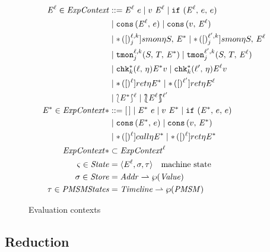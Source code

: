 \begin{figure}
\begin{align*}
\mctx{\mmlab} \in \ECtx &::=
      \sapp{\mctx{\mmlab}}{\mexp}
 \alt \sapp{\mval}{\mctx{\mmlab}}
 \alt \sif{\mctx{\mmlab}}{\mexp}{\mexp} \\
&\alt \vcons{\mctx{\mmlab}}{\mexp}
 \alt \vcons{\mval}{\mctx{\mmlab}} \\
&\alt \sSMon{\ell}{k}{j}{\mtimeline}{\mscon}{\mctx*}
 \alt \sSMon{\ell^\prime}{k}{j}{\mtimeline}{\mscon}{\mctx{\ell}} \\
&\alt \sTMon{\ell}{k}{j}{\mscon}{\mtcon}{\mctx*}
 \alt \sTMon{\ell^\prime}{k}{j}{\mscon}{\mtcon}{\mctx{\ell}} \\
&\alt \schk*{k}{\ell}{\mtimeline}{\mctx*}{\mval}
 \alt \schk*{k}{\ell^\prime}{\mtimeline}{\mctx{\ell}}{\mval} \\
&\alt \sret{\ell}{\mtimeline}{\mctx*}
 \alt \sret{\ell^\prime}{\mtimeline}{\mctx{\ell}} \\
&\alt \sown{\mctx*}{\ell}
 \alt \sOwn{\mctx{\ell}}{\ell^\prime}
\\
\mctx* \in \ECtx* &::=
      \hole
 \alt \sapp{\mctx*}{\mexp}
 \alt \sapp{\mval}{\mctx*}
 \alt \sif{\mctx*}{\mexp}{\mexp} \\
&\alt \vcons{\mctx*}{\mexp}
 \alt \vcons{\mval}{\mctx*} \\
&\alt \scall{\mmlab}{\mtimeline}{\mctx*}
 \alt \sret{\mmlab}{\mtimeline}{\mctx*} \\
\ECtx* &\subset \ECtx^\mmlab
\\
\mstate \in \State &= \chevron{\mctx{\mmlab}, \msto, \mTMons} \quad\text{machine state}
\\
\msto \in \Store &= \Addr \parto \wp(\Value)
\\
\mTMons \in \TMons &= \Timeline \parto \wp(\PMSM)
\end{align*}
\caption{Evaluation contexts}
\label{fig:ctx}
\end{figure}

\subsection{Reduction} \label{sec:reduction}

